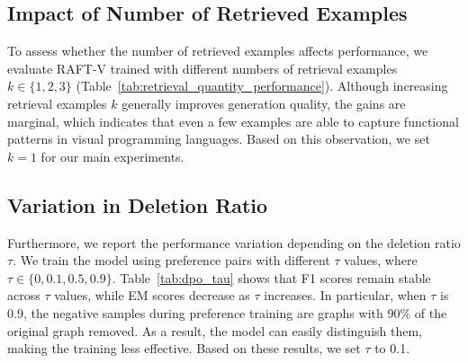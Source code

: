 \subsection{\label{sec:retrieved_examples}Impact of Number of Retrieved Examples}
\begin{table}[!t]
\centering
{}
\caption{Performance of RAFT-V across different numbers of retrieved examples $k$. We use the Llama3.1-8B-Instruct model with metaprogram format.}
\label{tab:retrieval_quantity_performance}
\end{table}
To assess whether the number of retrieved examples affects performance, we evaluate RAFT-V trained with different numbers of retrieval examples \( k \in \{1, 2, 3\} \) (Table~\ref{tab:retrieval_quantity_performance}). Although increasing retrieval examples \(k\) generally improves generation quality, the gains are marginal, which indicates that even a few examples are able to capture functional patterns in visual programming languages. Based on this observation, we set \( k = 1 \) for our main experiments.


\subsection{\label{sec:tau}Variation in Deletion Ratio}

Furthermore, we report the performance variation depending on the deletion ratio $\tau$. We train the model using preference pairs with different $\tau$ values, where $\tau \in \{0, 0.1, 0.5, 0.9\}$. Table~\ref{tab:dpo_tau} shows that F1 scores remain stable across $\tau$ values, while EM scores decrease as $\tau$ increases. In particular, when $\tau$ is 0.9, the negative samples during preference training are graphs with 90\% of the original graph removed. As a result, the model can easily distinguish them, making the training less effective. Based on these results, we set $\tau$ to 0.1.

